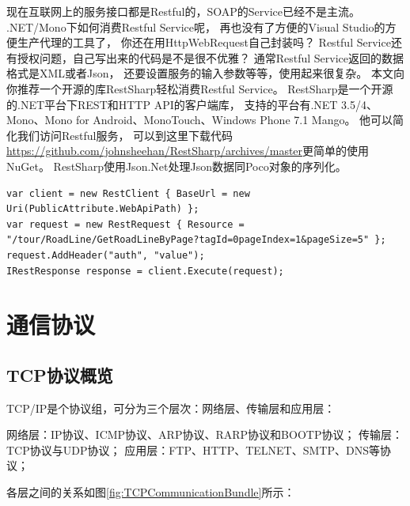 \documentclass{book}
\begin{document}
现在互联网上的服务接口都是Restful的，SOAP的Service已经不是主流。
.NET/Mono下如何消费Restful Service呢，
再也没有了方便的Visual Studio的方便生产代理的工具了，
你还在用HttpWebRequest自己封装吗？
Restful Service还有授权问题，自己写出来的代码是不是很不优雅？
通常Restful Service返回的数据格式是XML或者Json，
还要设置服务的输入参数等等，使用起来很复杂。
本文向你推荐一个开源的库RestSharp轻松消费Restful Service。
RestSharp是一个开源的.NET平台下REST和HTTP API的客户端库，
支持的平台有.NET 3.5/4、Mono、Mono for Android、MonoTouch、Windows Phone 7.1 Mango。
他可以简化我们访问Restful服务，
可以到这里下载代码\url{https://github.com/johnsheehan/RestSharp/archives/master}更简单的使用NuGet。
RestSharp使用Json.Net处理Json数据同Poco对象的序列化。

\begin{lstlisting}[language={[Sharp]C}]
var client = new RestClient { BaseUrl = new Uri(PublicAttribute.WebApiPath) };
var request = new RestRequest { Resource = "/tour/RoadLine/GetRoadLineByPage?tagId=0pageIndex=1&pageSize=5" };
request.AddHeader("auth", "value");
IRestResponse response = client.Execute(request);
\end{lstlisting}

\section{通信协议}

\subsection{TCP协议概览}

TCP/IP是个协议组，可分为三个层次：网络层、传输层和应用层：

网络层：IP协议、ICMP协议、ARP协议、RARP协议和BOOTP协议；
传输层：TCP协议与UDP协议；
应用层：FTP、HTTP、TELNET、SMTP、DNS等协议；

各层之间的关系如图\ref{fig:TCPCommunicationBundle}所示：
\end{document}
